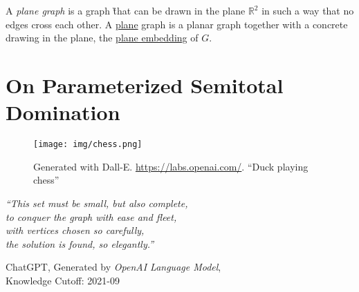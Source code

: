     

\begin{graphclass}

A \textit{plane graph} is a graph \G that can be drawn in the plane $\mathbb{R}^2$ in such a way that no edges cross each other.
A \underline{plane} graph is a planar graph together with a concrete drawing in the plane, the \underline{plane embedding} of $G$. 

\end{graphclass}



\chapter{On Parameterized Semitotal Domination}\label{ch:semitotal-domination}

\vspace*{-50pt}

\begin{figure}[ht]
        \texttt{[image: img/chess.png]}
        \captionsetup{textformat=empty,labelformat=blank}
        \caption[Generated with Dalle-E. Knowledge Cutoff 09-2022]{Generated with Dall-E. \url{https://labs.openai.com/}. ``Duck playing chess''}
\end{figure}

\epigraph{\itshape ``This set must be small, but also complete, \\ 
to conquer the
graph with ease and fleet, \\
with vertices chosen so carefully, \\
the solution is found, so elegantly.''
}{ChatGPT, Generated by \emph{OpenAI Language Model}, \\
Knowledge Cutoff: 2021-09}

